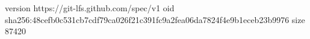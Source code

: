 version https://git-lfs.github.com/spec/v1
oid sha256:48cefb0c531cb7cdf79ca026f21c391fc9a2fea06da7824f4e9b1eceb23b9976
size 87420
